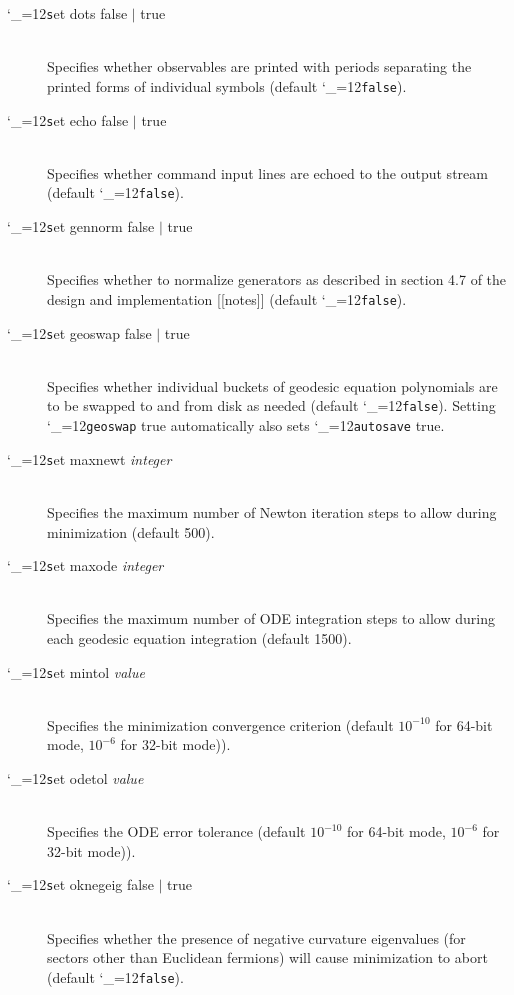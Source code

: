 \documentclass [12pt]{article}
\makeatletter
\renewcommand{\tt}{\begingroup\catcode`_=12\def\_{\string_}\tt@}
\newcommand{\tt@}[1]{\texttt{#1}\endgroup}
\makeatother
\begin{document}
\begin{description}
\item [\tt set dots false $\vert$ true]~\\
    Specifies whether observables are printed with
    periods separating the printed forms of individual symbols
    (default \tt{false}).

\item [\tt set echo false $\vert$ true]~\\
    Specifies whether command input lines are echoed
    to the output stream (default \tt{false}).

\item [\tt set gennorm false $\vert$ true]~\\
    Specifies whether to normalize generators
    as described in section 4.7 of the
    design and implementation [[notes]]
    (default \tt{false}).

\item [\tt set geoswap false $\vert$ true]~\\
    Specifies whether individual buckets of
    geodesic equation polynomials are to be
    swapped to and from disk as needed
    (default \tt{false}).
    Setting \tt{geoswap} true automatically
    also sets \tt{autosave} true.

\item [\tt set maxnewt {\it integer}]~\\
    Specifies the maximum number of
    Newton iteration steps to allow
    during minimization
    (default 500).

\item [\tt set maxode {\it integer}]~\\
    Specifies the maximum number of
    ODE integration steps to allow
    during each geodesic equation integration
    (default 1500).

\item [\tt set mintol {\it value}]~\\
    Specifies the minimization convergence criterion
    (default $10^{-10}$ for 64-bit mode,
    $10^{-6}$ for 32-bit mode)).

\item [\tt set odetol {\it value}]~\\
    Specifies the ODE error tolerance
    (default $10^{-10}$ for 64-bit mode,
    $10^{-6}$ for 32-bit mode)).

\item [\tt set oknegeig false $\vert$ true]~\\
    Specifies whether the presence of negative
    curvature eigenvalues (for sectors other than 
    Euclidean fermions) will cause minimization to abort
    (default \tt{false}).


\end{description}
\end{document}
